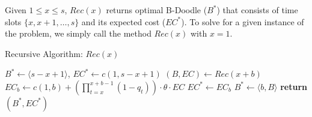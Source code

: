 Given $1 \leq x \leq s$, $Rec(x)$ returns optimal B-Doodle ($B^*$) that consists of time slots $\{x, x+1, \dots, s\}$ and its expected cost ($EC^*$). To solve for a given instance of the problem, we simply call the method $Rec(x)$ with $x = 1$.

\begin{algorithm}
\caption{Recursive Algorithm: $Rec(x)$}
\label{bdoodle:alg:recursive}
\begin{algorithmic}[1]
	\State ${B}^* \gets \langle s-x+1 \rangle$, $EC^* \gets c(1, s-x+1)$
		\State $({B}, EC) \gets Rec( x+b )$
		\State $EC_b \gets c(1, b) + \left(\prod_{t=x}^{x+b-1} (1 - q_t)\right)\cdot \theta \cdot EC$
			\State $EC^* \gets EC_b$
			\State $B^* \gets \langle b, {B} \rangle$
		\EndIf
	\EndFor
	\State \textbf{return} $({B}^*, EC^*)$
\end{algorithmic}
\end{algorithm}

